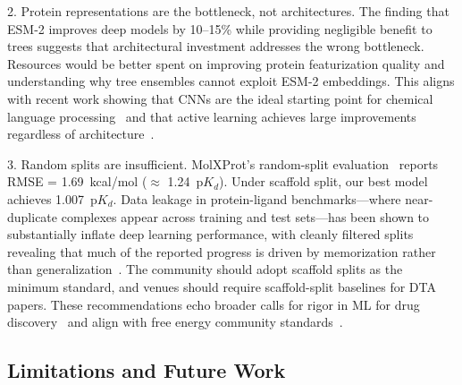 \documentclass[pmlr,twocolumn]{jmlr}
\begin{document}
2. Protein representations are the bottleneck, not architectures. The finding that ESM-2 improves deep models by 10--15\% while providing negligible benefit to trees suggests that architectural investment addresses the wrong bottleneck. Resources would be better spent on improving protein featurization quality and understanding why tree ensembles cannot exploit ESM-2 embeddings. This aligns with recent work showing that CNNs are the ideal starting point for chemical language processing~\citep{ozcelik2024hitchhiker} and that active learning achieves large improvements regardless of architecture~\citep{tilborg2024active,srivastava2026explainable}.

3. Random splits are insufficient. MolXProt's random-split evaluation~\citep{cucco2026molxprot} reports RMSE = 1.69~kcal/mol ($\approx$ 1.24~p$K_d$). Under scaffold split, our best model achieves 1.007~p$K_d$. Data leakage in protein-ligand benchmarks---where near-duplicate complexes appear across training and test sets---has been shown to substantially inflate deep learning performance, with cleanly filtered splits revealing that much of the reported progress is driven by memorization rather than generalization~\citep{graber2025databias}. The community should adopt scaffold splits as the minimum standard, and venues should require scaffold-split baselines for DTA papers. These recommendations echo broader calls for rigor in ML for drug discovery~\citep{jimenez2020xai,ash2025protocols} and align with free energy community standards~\citep{shirts2008mbar,mey2024benchmark}.

\subsection{Limitations and Future Work}
\end{document}
